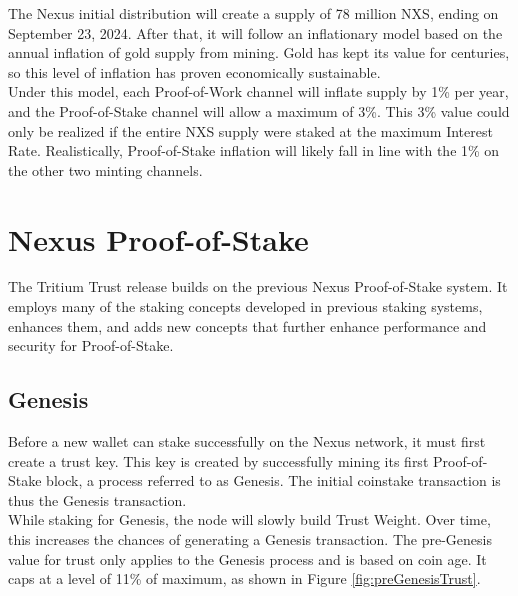 \documentclass[11pt]{article}
\begin{document}
\noindent The Nexus initial distribution will create a supply of 78 million NXS, ending on September 23, 2024. After that, it will follow an inflationary model based on the annual inflation of gold supply from mining. Gold has kept its value for centuries, so this level of inflation has proven economically sustainable. \\

\noindent Under this model, each Proof-of-Work channel will inflate supply by 1\% per year, and the Proof-of-Stake channel will allow a maximum of 3\%. This 3\% value could only be realized if the entire NXS supply were staked at the maximum Interest Rate. Realistically, Proof-of-Stake inflation will likely fall in line with the 1\% on the other two minting channels.\\

\bigskip

\section{Nexus Proof-of-Stake}
The Tritium Trust release builds on the previous Nexus Proof-of-Stake system. It employs many of the staking concepts developed in previous staking systems, enhances them, and adds new concepts that further enhance performance and security for Proof-of-Stake.\\

\subsection{Genesis}
Before a new wallet can stake successfully on the Nexus network, it must first create a trust key. This key is created by successfully mining its first 
Proof-of-Stake block, a process referred to as Genesis. The initial coinstake transaction is thus the Genesis transaction. \\

\noindent While staking for Genesis, the node will slowly build Trust Weight. Over time, this increases the chances of generating a Genesis transaction. The pre-Genesis value for trust only applies to the Genesis process and is based on coin age. It caps at a level of 11\% of maximum, as shown in Figure \ref{fig:preGenesisTrust}.\\
\end{document}
